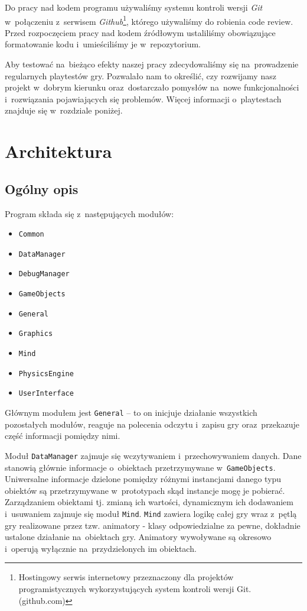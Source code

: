 \documentclass[licencjacka]{pracamgr}
\begin{document}
    Do pracy nad kodem programu używaliśmy systemu kontroli wersji \emph{Git} w~połączeniu z~serwisem \emph{Github}\footnote{Hostingowy
    serwis internetowy przeznaczony dla projektów programistycznych wykorzystujących system kontroli wersji Git. (github.com)}, którego używaliśmy
    do robienia code review. Przed rozpoczęciem pracy nad kodem źródłowym ustaliliśmy obowiązujące formatowanie kodu i~umieściliśmy je w~repozytorium.

    Aby testować na~bieżąco efekty naszej pracy zdecydowaliśmy się na~prowadzenie regularnych playtestów gry. Pozwalało nam to określić,
    czy rozwijamy nasz projekt w~dobrym kierunku oraz~dostarczało pomysłów na~nowe funkcjonalności i~rozwiązania pojawiających się problemów.
    Więcej informacji o~playtestach znajduje się w~rozdziale poniżej.

\chapter{Architektura}
  \section{Ogólny opis}
    Program składa się z~następujących modułów:
    \begin{itemize}
      \item \texttt{Common}
      \item \texttt{DataManager}
      \item \texttt{DebugManager}
      \item \texttt{GameObjects}
      \item \texttt{General}
      \item \texttt{Graphics}
      \item \texttt{Mind}
      \item \texttt{PhysicsEngine}
      \item \texttt{UserInterface}
    \end{itemize}

    Głównym modułem jest \texttt{General} -- to on inicjuje działanie wszystkich pozostałych modułów, reaguje na
    polecenia odczytu i~zapisu gry oraz~przekazuje część informacji pomiędzy nimi.

    Moduł \texttt{DataManager} zajmuje się wczytywaniem i~przechowywaniem danych. Dane stanowią głównie informacje
    o~obiektach przetrzymywane w~\texttt{GameObjects}. Uniwersalne informacje dzielone pomiędzy różnymi instancjami danego
    typu obiektów są przetrzymywane w~prototypach skąd instancje mogę je pobierać. Zarządzaniem obiektami tj. zmianą ich wartości,
    dynamicznym ich dodawaniem i~usuwaniem zajmuje się moduł \texttt{Mind}. \texttt{Mind} zawiera logikę całej gry wraz z~pętlą gry
    realizowane przez tzw. animatory - klasy odpowiedzialne za pewne, dokładnie ustalone działanie na~obiektach gry.
    Animatory wywoływane są okresowo i~operują wyłącznie na~przydzielonych im obiektach.
\end{document}
